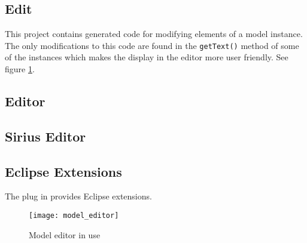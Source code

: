 \subsection{Edit}
This project contains generated code for modifying elements of a model instance. The only
modifications to this code are found in the \texttt{getText()} method of some of the instances
which makes the display in the editor more user friendly. See figure \ref{fig:model_editor}.
\subsection{Editor}
\subsection{Sirius Editor}
\subsection{Eclipse Extensions}
The plug in provides Eclipse extensions. 
\begin{figure}[h]
    \texttt{[image: model\_editor]}
    \caption{Model editor in use}
    \label{fig:model_editor}
\end{figure}
